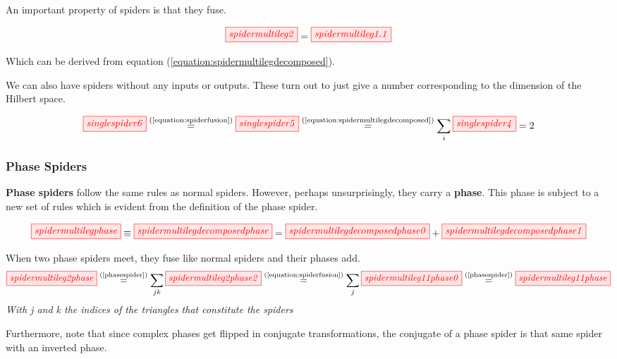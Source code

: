 \documentclass[]{article}
\newcommand{\equaltext}[1]{\ensuremath{\stackrel{\text{#1}}{=}}}
\begin{document}
An important property of spiders is that they fuse.

\begin{equation}
\label{equation:spiderfusion}
	\tikzfig{spidermultileg2} = \tikzfig{spidermultileg1.1}
\end{equation}

Which can be derived from equation (\ref{equation:spidermultilegdecomposed}).

We can also have spiders without any inputs or outputs. These turn out to just give a number corresponding to the dimension of the Hilbert space.

\begin{equation}
	\label{equation:singlespider}
	\tikzfig{singlespider6} \equaltext{(\ref{equation:spiderfusion})}
	\tikzfig{singlespider5}  \equaltext{(\ref{equation:spidermultilegdecomposed})}
	\sum\limits_i \tikzfig{singlespider4} = 2
\end{equation}



\subsubsection{Phase Spiders}
\label{phasespiders}

\textbf{Phase spiders} follow the same rules as normal spiders. However, perhaps unsurprisingly, they carry a \textbf{phase}. This phase is subject to a new set of rules which is evident from the definition of the phase spider. 

\begin{equation}
\label{phasespider}
\tikzfig{spidermultilegphase} \equiv \tikzfig{spidermultilegdecomposedphase} = \tikzfig{spidermultilegdecomposedphase0} + \tikzfig{spidermultilegdecomposedphase1}
\end{equation}

When two phase spiders meet, they fuse like normal spiders and their phases add.
\begin{equation}
\label{equation:phasespiderfusion}
	\tikzfig{spidermultileg2phase} \equaltext{(\ref{phasespider})} \sum\limits_{jk} \tikzfig{spidermultileg2phase2} \equaltext{(\ref{equation:spiderfusion})} \sum\limits_{j} \tikzfig{spidermultileg11phase0} \equaltext{(\ref{phasespider})} \tikzfig{spidermultileg11phase}
\end{equation}
\textit{With j and k the indices of the triangles that constitute the spiders}

Furthermore, note that since complex phases get flipped in conjugate transformations, the conjugate of a phase spider is that same spider with an inverted phase.
\end{document}
